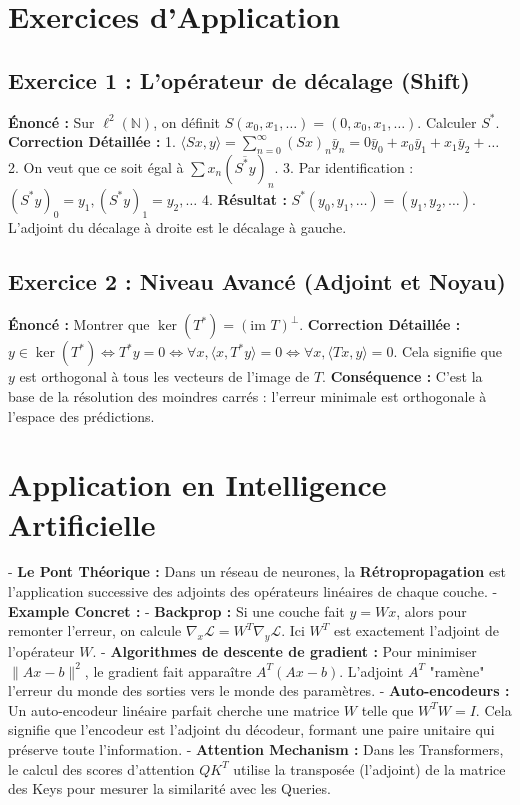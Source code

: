 \documentclass[11pt,a4paper]{article}
\begin{document}
\section{Exercices d'Application}

\subsection{Exercice 1 : L'opérateur de décalage (Shift)}
\textbf{Énoncé :} Sur $\ell^2(\mathbb{N})$, on définit $S(x_0, x_1, \dots) = (0, x_0, x_1, \dots)$. Calculer $S^*$.
\textbf{Correction Détaillée :}
1. $\langle Sx, y \rangle = \sum_{n=0}^\infty (Sx)_n \bar{y}_n = 0\bar{y}_0 + x_0 \bar{y}_1 + x_1 \bar{y}_2 + \dots$
2. On veut que ce soit égal à $\sum x_n (\overline{S^*y})_n$.
3. Par identification : $(S^*y)_0 = y_1, (S^*y)_1 = y_2, \dots$
4. \textbf{Résultat :} $S^*(y_0, y_1, \dots) = (y_1, y_2, \dots)$.
L'adjoint du décalage à droite est le décalage à gauche.

\subsection{Exercice 2 : Niveau Avancé (Adjoint et Noyau)}
\textbf{Énoncé :} Montrer que $\ker(T^*) = (\text{im } T)^\perp$.
\textbf{Correction Détaillée :}
$y \in \ker(T^*) \iff T^*y = 0 \iff \forall x, \langle x, T^*y \rangle = 0 \iff \forall x, \langle Tx, y \rangle = 0$.
Cela signifie que $y$ est orthogonal à tous les vecteurs de l'image de $T$.
\textbf{Conséquence :} C'est la base de la résolution des moindres carrés : l'erreur minimale est orthogonale à l'espace des prédictions.

\section{Application en Intelligence Artificielle}

- \textbf{Le Pont Théorique :} Dans un réseau de neurones, la \textbf{Rétropropagation} est l'application successive des adjoints des opérateurs linéaires de chaque couche.
- \textbf{Example Concret :}
    - \textbf{Backprop :} Si une couche fait $y = Wx$, alors pour remonter l'erreur, on calcule $\nabla_x \mathcal{L} = W^T \nabla_y \mathcal{L}$. Ici $W^T$ est exactement l'adjoint de l'opérateur $W$.
    - \textbf{Algorithmes de descente de gradient :} Pour minimiser $\|Ax - b\|^2$, le gradient fait apparaître $A^T(Ax-b)$. L'adjoint $A^T$ "ramène" l'erreur du monde des sorties vers le monde des paramètres.
    - \textbf{Auto-encodeurs :} Un auto-encodeur linéaire parfait cherche une matrice $W$ telle que $W^T W = I$. Cela signifie que l'encodeur est l'adjoint du décodeur, formant une paire unitaire qui préserve toute l'information.
    - \textbf{Attention Mechanism :} Dans les Transformers, le calcul des scores d'attention $QK^T$ utilise la transposée (l'adjoint) de la matrice des Keys pour mesurer la similarité avec les Queries.
\end{document}

